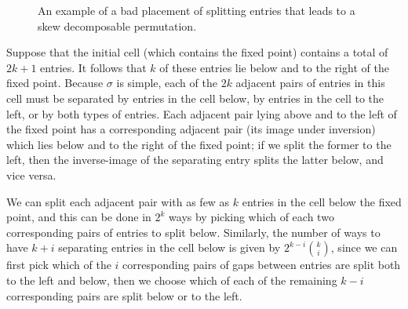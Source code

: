 \documentclass[12pt,twoside]{memoir}
\begin{document}
      \begin{figure}[t]
      \centering
      \caption[An example of a bad placement]{
          An example of a bad placement of splitting entries that leads to
          a skew decomposable permutation.} 
      \label{involutions:fig:bad-case}
      \end{figure}


      Suppose that the initial cell (which contains the fixed point) contains a total
      of $2k+1$ entries. It follows that $k$ of these entries lie below and to the
      right of the fixed point. Because $\sigma$ is simple, each of the $2k$ adjacent
      pairs of entries in this cell must be separated by entries in the cell below,
      by entries in the cell to the left, or by both types of entries. Each adjacent
      pair lying above and to the left of the fixed point has a corresponding
      adjacent pair (its image under inversion) which lies below and to the right of
      the fixed point; if we split the former to the left, then the inverse-image of
      the separating entry splits the latter below, and vice versa.

      We can split each adjacent pair with as few as $k$ entries in the cell below
      the fixed point, and this can be done in $2^k$ ways by picking which of each
      two corresponding pairs of entries to split below. Similarly, the number of
      ways to have $k+i$ separating entries in the cell below is given by $2^{k-i}{k
      \choose i}$, since we can first pick which of the $i$ corresponding pairs of
      gaps between entries are split both to the left and below, then we choose which
      of each of the remaining $k-i$ corresponding pairs are split below or to the
      left.
\end{document}
